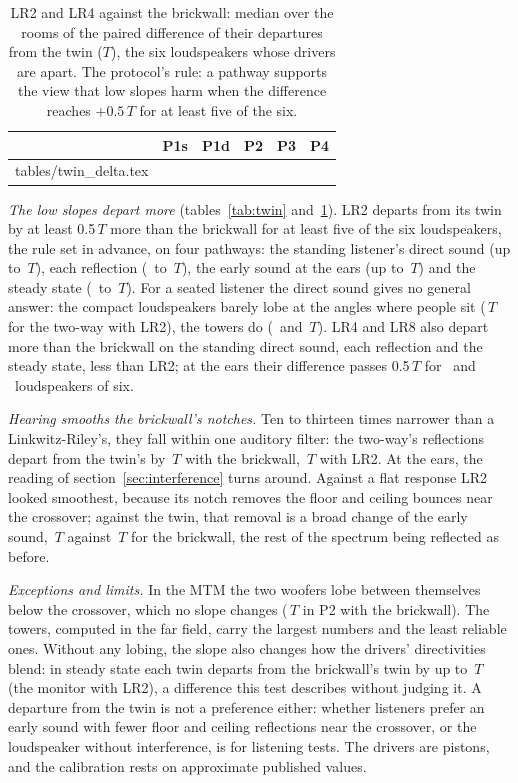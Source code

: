 \documentclass[11pt,a4paper]{article}
\makeatletter
\newcommand{\rows}[1]{\@@input tables/#1.tex }
\makeatother
\begin{document}
\begin{table}[t]
\centering
\caption{LR2 and LR4 against the brickwall: median over the rooms of the paired difference of their
departures from the twin ($T$), the six loudspeakers whose drivers are apart. The protocol's rule: a
pathway supports the view that low slopes harm when the difference reaches $+0.5\,T$ for at least five of
the six.}
\label{tab:twin-delta}
\small
\begin{tabular}{lrrrrr}
\toprule
& P1s & P1d & P2 & P3 & P4 \\
\midrule
\rows{twin_delta}
\bottomrule
\end{tabular}
\end{table}

\emph{The low slopes depart more} (tables~\ref{tab:twin} and~\ref{tab:twin-delta}). LR2 departs from its
twin by at least 0.5\,$T$ more than the brickwall for at least five of the six loudspeakers, the rule set in
advance, on four pathways: the standing listener's direct sound (up to \nslDLrTwoFirStandingMax\,$T$),
each reflection (\nslDLrTwoFirReflMin\ to \nslDLrTwoFirReflMax\,$T$), the early sound at the ears (up to
\nslDLrTwoFirEarsMax\,$T$) and the steady state (\nslDLrTwoFirSteadyMin\ to \nslDLrTwoFirSteadyMax\,$T$).
For a seated listener the direct sound gives no general answer: the compact loudspeakers barely lobe at
the angles where people sit (\nslDomeLrTwoSeated\,$T$ for the two-way with LR2), the towers do
(\nslTowerThreeLrTwoSeated\ and \nslTowerFourLrTwoSeated\,$T$). LR4 and LR8 also depart more than the
brickwall on the standing direct sound, each reflection and the steady state, less than LR2; at the ears
their difference passes 0.5\,$T$ for \nslDLrFourFirEarsUp\ and \nslDLrEightFirEarsUp\ loudspeakers of six.

\emph{Hearing smooths the brickwall's notches.} Ten to thirteen times narrower than a Linkwitz-Riley's,
they fall within one auditory filter: the two-way's reflections depart from the twin's by
\nslDomeFirRefl\,$T$ with the brickwall, \nslDomeLrTwoRefl\,$T$ with LR2. At the ears, the reading of
section~\ref{sec:interference} turns around. Against a flat response LR2 looked smoothest, because its
notch removes the floor and ceiling bounces near the crossover; against the twin, that removal is a broad
change of the early sound, \nslDomeLrTwoEars\,$T$ against \nslDomeFirEars\,$T$ for the brickwall, the rest
of the spectrum being reflected as before.

\emph{Exceptions and limits.} In the MTM the two woofers lobe between themselves below the crossover,
which no slope changes (\nslMtmFirRefl\,$T$ in P2 with the brickwall). The towers, computed in the far
field, carry the largest numbers and the least reliable ones. Without any lobing, the slope also changes
how the drivers' directivities blend: in steady state each twin departs from the brickwall's twin by up
to \nslBlendMonitorLrTwo\,$T$ (the monitor with LR2), a difference this test describes without judging
it. A departure from the twin is not a preference either: whether listeners prefer an early sound with
fewer floor and ceiling reflections near the crossover, or the loudspeaker without interference, is for
listening tests. The drivers are pistons, and the calibration rests on approximate published values.
\end{document}
